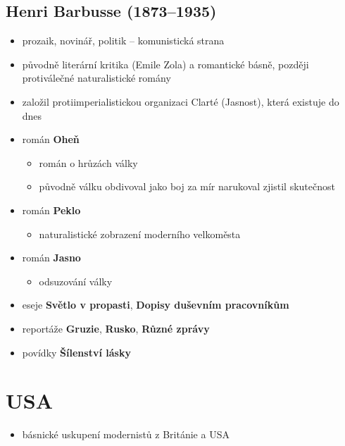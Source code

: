 \subsection{Henri Barbusse (1873--1935)}
\begin{itemize}
\item prozaik, novinář, politik -- komunistická strana
\item původně literární kritika (Emile Zola) a romantické básně, později protiválečné naturalistické romány
\item založil protiimperialistickou organizaci Clarté (Jasnost), která existuje do dnes
\item román \textbf{Oheň}
	\begin{itemize}
	\item román o hrůzách války
	\item původně válku obdivoval jako boj za mír \ra narukoval \ra zjistil skutečnost
	\end{itemize}
\item román \textbf{Peklo}
	\begin{itemize}
	\item naturalistické zobrazení moderního velkoměsta
	\end{itemize}
\item román \textbf{Jasno}
	\begin{itemize}
	\item odsuzování války
	\end{itemize}
\item eseje \textbf{Světlo v propasti}, \textbf{Dopisy duševním pracovníkům}
\item reportáže \textbf{Gruzie}, \textbf{Rusko}, \textbf{Různé zprávy}
\item povídky \textbf{Šílenství lásky}
\end{itemize}



\section{USA}
\begin{itemize}
\item básnické uskupení modernistů z Británie a USA
\end{itemize}

